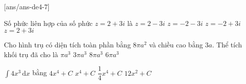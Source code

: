 
\begin{name}
	{\tenchude}
	{\tendethi}
	{\tentruong}
	{\thoigian}
\end{name}
[ans/ans-de4-7]

\begin{ex}%
Số phức liên hợp của số phức $z=2+3 i$ là
\choice
{\True $z=2-3 i$}
{$z=-2-3 i$}
{$z=-2+3 i$}
{$z=2+3 i$}

\end{ex}
\begin{ex}%
Cho hình trụ có diện tích toàn phần bằng $8\pi a^2$ và chiều cao bằng $3 a$. Thể tích khối trụ đã cho là
\choice
{$\pi a^3$}
{\True $3\pi a^3$}
{$8\pi a^3$}
{$6\pi a^3$}

\end{ex}

\begin{ex}%
$\displaystyle\int 4 x^3 \mathrm{\,d} x$ bằng
\choice
{$4 x^4+C$}
{\True $x^4+C$}
{$\dfrac{1}{4} x^4+C$}
{$12 x^2+C$}

\end{ex}

